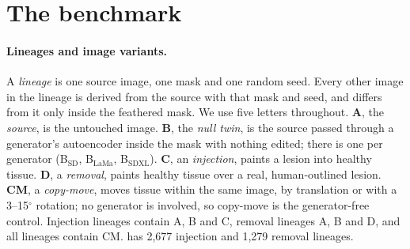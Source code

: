 \section{The \dataset benchmark}
\label{sec:dataset}

\paragraph{Lineages and image variants.}
A \emph{lineage} is one source image, one mask and one random seed.
Every other image in the lineage is derived from the source with that mask and seed, and differs from it only inside the feathered mask.
We use five letters throughout.
\textbf{A}, the \emph{source}, is the untouched image.
\textbf{B}, the \emph{null twin}, is the source passed through a generator's autoencoder inside the mask with nothing edited; there is one per generator (B$_\text{SD}$, B$_\text{LaMa}$, B$_\text{SDXL}$).
\textbf{C}, an \emph{injection}, paints a lesion into healthy tissue.
\textbf{D}, a \emph{removal}, paints healthy tissue over a real, human-outlined lesion.
\textbf{CM}, a \emph{copy-move}, moves tissue within the same image, by translation or with a 3--15$^\circ$ rotation; %
no generator is involved, so copy-move is the generator-free control.
Injection lineages contain A, B and C, removal lineages A, B and D, and all lineages contain CM.
\dataset has 2,677 injection and 1,279 removal lineages. %

